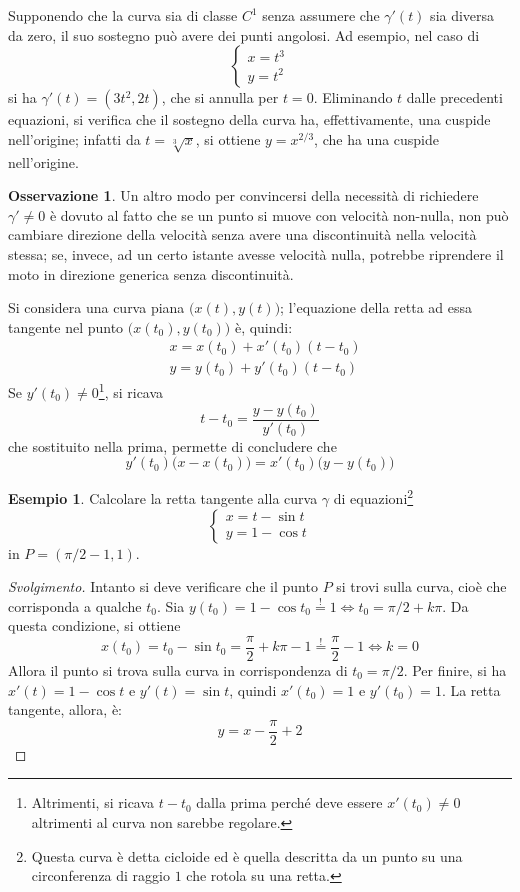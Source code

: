 \documentclass[10pt, a4paper]{scrartcl}
\newenvironment{svolgimento}{\renewcommand\qedsymbol{$\blacksquare$}\begin{proof}[Svolgimento]}{\end{proof}}
\theoremstyle{definition}
\newtheorem{esempio}{Esempio}
\numberwithin{esempio}{section}
\theoremstyle{definition}
\newtheorem{obs}{Osservazione}
\numberwithin{obs}{section}
\numberwithin{nota}{section}
\numberwithin{equation}{subsection}
\begin{document}
\noindent Supponendo che la curva sia di classe $C^1$ senza assumere che $\gamma'(t)$ sia diversa da zero, il suo sostegno pu\`o avere dei punti angolosi. 
Ad esempio, nel caso di 
\[
\begin{cases}
	x = t^3\\
	y = t^2
\end{cases}
\] 
si ha $\gamma'(t) = (3t^2 , 2t)$, che si annulla per $t= 0$.
Eliminando $t$ dalle precedenti equazioni, si verifica che il sostegno della curva ha, effettivamente, una cuspide nell'origine; infatti da $t=\sqrt[3]{x} $, si ottiene $y= x^{2  / 3} $, che ha una cuspide nell'origine.

\begin{obs}
	Un altro modo per convincersi della necessit\`a di richiedere $\gamma' \neq 0$ \`e dovuto al fatto che se un punto si muove con velocit\`a non-nulla, non pu\`o cambiare direzione della velocit\`a senza avere una discontinuit\`a nella velocit\`a stessa; se, invece, ad un certo istante avesse velocit\`a nulla, potrebbe riprendere il moto in direzione generica senza discontinuit\`a.
\end{obs}
Si considera una curva piana $\big(x(t) , y(t)\big)$; l'equazione della retta ad essa tangente nel punto $\big(x(t_0) , y(t_0)\big)$ \`e, quindi:
\[
\begin{split}
	& x = x(t_0) + x'(t_0) (t-t_0)\\
	& y= y(t_0) + y'(t_0) (t-t_0)
\end{split}
\] 
Se $y'(t_0)  \neq 0$\footnote{Altrimenti, si ricava $t-t_0$ dalla prima perch\'e deve essere $x'(t_0) \neq 0 $ altrimenti al curva non sarebbe regolare.}, si ricava 
\[
t-t_0 = \frac{y-y(t_0)}{y'(t_0)}
\] 
che sostituito nella prima, permette di concludere che
\begin{equation}
y'(t_0) \big(x-x(t_0)\big) = x'(t_0) \big(y-y(t_0)\big)
\end{equation}
\begin{esempio}
	Calcolare la retta tangente alla curva $\gamma$ di equazioni\footnote{Questa curva \`e detta cicloide ed \`e quella descritta da un punto su una circonferenza di raggio $1$ che rotola su una retta.}
\[
\begin{cases}
	x = t- \sin t\\
	y = 1- \cos t
\end{cases}
\] 
in $P = (\pi / 2 - 1 , 1)$.
\begin{svolgimento}
	Intanto si deve verificare che il punto $P$ si trovi sulla curva, cio\`e che corrisponda a qualche $t_0$.
	Sia $y(t_0) = 1- \cos t_0 \stackrel{!}{=} 1\iff t_0 = \pi/2 + k\pi$. 
	Da questa condizione, si ottiene
	\[
	x(t_0) = t_0 - \sin t_0 = \frac{\pi}{2} + k\pi - 1 \stackrel{!}{=} \frac{\pi}{2}-1 \iff k=0
	\] 
	Allora il punto si trova sulla curva in corrispondenza di $t_0 = \pi / 2$.
	Per finire, si ha $x'(t) = 1 - \cos t$ e $y'(t) = \sin t$, quindi $x'(t_0) = 1$ e $y'(t_0) = 1$. 
La retta tangente, allora, \`e:
\[
y = x - \frac{\pi}{2} + 2
\] 

\end{svolgimento}
\end{esempio}
\end{document}
